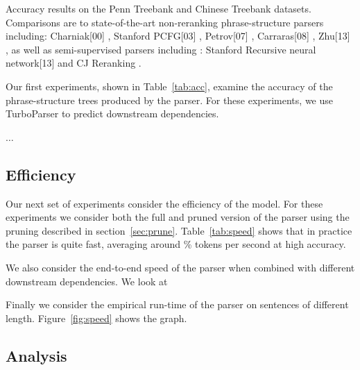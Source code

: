 \documentclass[11pt,letterpaper]{article}
\newcommand{\ParseName}{\textsc{ParPar}}
\begin{document}
\begin{table}
  \label{tab:acc}
  \caption{ Accuracy results on the Penn Treebank and Chinese Treebank datasets. Comparisons are to state-of-the-art non-reranking phrase-structure parsers including:  Charniak[00] \cite{charniak2000maximum}, Stanford PCFG[03] \cite{klein2003accurate}, Petrov[07] \cite{petrov2007improved}, Carraras[08] \cite{carreras2008tag}, Zhu[13] \cite{zhu2013fast}, as well as semi-supervised parsers including : Stanford Recursive neural network[13] \cite{socher2013parsing} and CJ Reranking \cite{charniak2005coarse}. }
\end{table}

Our first experiments, shown in Table~\ref{tab:acc}, examine the accuracy of the phrase-structure trees produced by the parser. For these experiments,
we use TurboParser \cite{martins2013turning} to predict downstream dependencies.

$\ldots$


\subsection{Efficiency}

Our next set of experiments consider the efficiency of the model. For these experiments we consider both the full and pruned version of the parser using the pruning described in section~\ref{sec:prune}. Table~\ref{tab:speed} shows that in practice the parser is quite fast,  averaging around \% tokens per second at high accuracy.

We also consider the end-to-end speed of the parser when combined with different downstream dependencies. We look at

Finally we consider the empirical run-time of the parser on sentences of different length. Figure~\ref{fig:speed} shows the graph.


\subsection{Analysis}
\label{sec:analysis}
\end{document}
